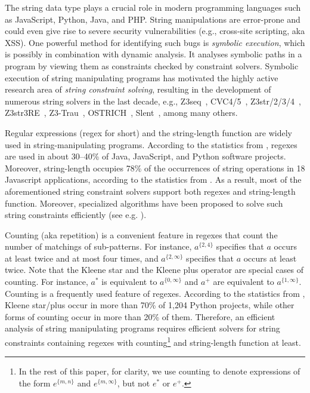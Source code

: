 The string data type plays a crucial role in modern programming languages such as JavaScript, Python, Java, and PHP. 
String manipulations are error-prone and could even give rise to severe security vulnerabilities (e.g., cross-site scripting, aka XSS). 
One powerful method for identifying such bugs is \emph{symbolic execution}, which is possibly in combination with dynamic analysis. It analyses symbolic paths in a program by viewing them as constraints checked by constraint solvers. 
%
Symbolic execution of string manipulating programs has motivated the highly active research area of \emph{string constraint solving}, resulting in the development of numerous string solvers in the last decade, e.g.,
Z3seq~\cite{z3seq}, CVC4/5~\cite{cvc4,cvc5}, Z3str/2/3/4~\cite{Z3-str,Z3-str2,Z3-str3,BerzishMurphy2021}, Z3str3RE~\cite{BD+23}, 
Z3-Trau~\cite{Z3-trau}\cite{z3trau}, OSTRICH~\cite{CHL+19}, Slent~\cite{WC+18}, among many others. 

Regular expressions (regex for short) and the string-length function are widely used in string-manipulating programs. According to the statistics from \cite{CS16,DCSL18,WS18}, regexes are used in about 30–40\% of Java, JavaScript, and Python software projects. 
Moreover, string-length occupies 78\% of the occurrences of string operations in 18 Javascript applications, according to the statistics from \cite{malware_detection_3_kudzu}. 
As a result, most of the aforementioned string constraint solvers support both regexes and string-length function. Moreover, specialized algorithms have been proposed to solve such string constraints efficiently (see e.g. \cite{LTR+15,BD+23}). 

Counting (aka repetition) is a convenient feature in regexes that count the number of matchings of sub-patterns. For instance, $a^{\{2, 4\}}$ specifies that $a$ occurs at least twice and at most four times, and $a^{\{2, \infty\}}$ specifies that $a$ occurs at least twice. 
Note that the Kleene star and the Kleene plus operator are special cases of counting. For instance, $a^*$ is equivalent to $a^{\{0,\infty\}}$ and $a^+$ are equivalent to $a^{\{1,\infty\}}$.
Counting is a frequently used feature of regexes. According to the statistics from \cite{CS16}, Kleene star/plus occur in more than 70\% of 1,204 Python projects, while other forms of counting occur in more than 20\% of them. Therefore, an efficient analysis of string manipulating programs requires efficient solvers for string constraints containing regexes with counting\footnote{In the rest of this paper, for clarity, we use counting to denote expressions of the form $e^{\{m, n\}}$ and  $e^{\{m, \infty\}}$, but not $e^*$ or $e^+$.} and string-length function at least. 

